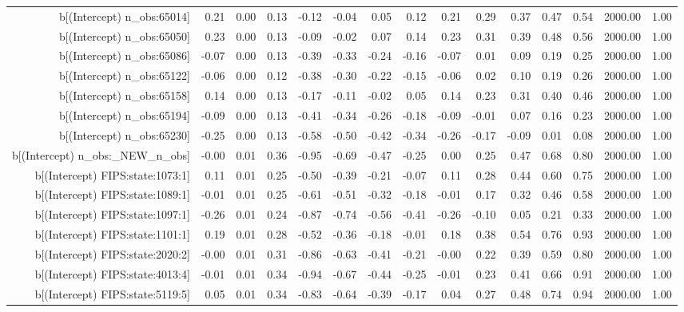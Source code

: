 \begin{table}[ht]
\begin{tabular}{rrrrrrrrrrrrrrr}
  b[(Intercept) n\_obs:65014] & 0.21 & 0.00 & 0.13 & -0.12 & -0.04 & 0.05 & 0.12 & 0.21 & 0.29 & 0.37 & 0.47 & 0.54 & 2000.00 & 1.00 \\ 
  b[(Intercept) n\_obs:65050] & 0.23 & 0.00 & 0.13 & -0.09 & -0.02 & 0.07 & 0.14 & 0.23 & 0.31 & 0.39 & 0.48 & 0.56 & 2000.00 & 1.00 \\ 
  b[(Intercept) n\_obs:65086] & -0.07 & 0.00 & 0.13 & -0.39 & -0.33 & -0.24 & -0.16 & -0.07 & 0.01 & 0.09 & 0.19 & 0.25 & 2000.00 & 1.00 \\ 
  b[(Intercept) n\_obs:65122] & -0.06 & 0.00 & 0.12 & -0.38 & -0.30 & -0.22 & -0.15 & -0.06 & 0.02 & 0.10 & 0.19 & 0.26 & 2000.00 & 1.00 \\ 
  b[(Intercept) n\_obs:65158] & 0.14 & 0.00 & 0.13 & -0.17 & -0.11 & -0.02 & 0.05 & 0.14 & 0.23 & 0.31 & 0.40 & 0.46 & 2000.00 & 1.00 \\ 
  b[(Intercept) n\_obs:65194] & -0.09 & 0.00 & 0.13 & -0.41 & -0.34 & -0.26 & -0.18 & -0.09 & -0.01 & 0.07 & 0.16 & 0.23 & 2000.00 & 1.00 \\ 
  b[(Intercept) n\_obs:65230] & -0.25 & 0.00 & 0.13 & -0.58 & -0.50 & -0.42 & -0.34 & -0.26 & -0.17 & -0.09 & 0.01 & 0.08 & 2000.00 & 1.00 \\ 
  b[(Intercept) n\_obs:\_NEW\_n\_obs] & -0.00 & 0.01 & 0.36 & -0.95 & -0.69 & -0.47 & -0.25 & 0.00 & 0.25 & 0.47 & 0.68 & 0.80 & 2000.00 & 1.00 \\ 
  b[(Intercept) FIPS:state:1073:1] & 0.11 & 0.01 & 0.25 & -0.50 & -0.39 & -0.21 & -0.07 & 0.11 & 0.28 & 0.44 & 0.60 & 0.75 & 2000.00 & 1.00 \\ 
  b[(Intercept) FIPS:state:1089:1] & -0.01 & 0.01 & 0.25 & -0.61 & -0.51 & -0.32 & -0.18 & -0.01 & 0.17 & 0.32 & 0.46 & 0.58 & 2000.00 & 1.00 \\ 
  b[(Intercept) FIPS:state:1097:1] & -0.26 & 0.01 & 0.24 & -0.87 & -0.74 & -0.56 & -0.41 & -0.26 & -0.10 & 0.05 & 0.21 & 0.33 & 2000.00 & 1.00 \\ 
  b[(Intercept) FIPS:state:1101:1] & 0.19 & 0.01 & 0.28 & -0.52 & -0.36 & -0.18 & -0.01 & 0.18 & 0.38 & 0.54 & 0.76 & 0.93 & 2000.00 & 1.00 \\ 
  b[(Intercept) FIPS:state:2020:2] & -0.00 & 0.01 & 0.31 & -0.86 & -0.63 & -0.41 & -0.21 & -0.00 & 0.22 & 0.39 & 0.59 & 0.80 & 2000.00 & 1.00 \\ 
  b[(Intercept) FIPS:state:4013:4] & -0.01 & 0.01 & 0.34 & -0.94 & -0.67 & -0.44 & -0.25 & -0.01 & 0.23 & 0.41 & 0.66 & 0.91 & 2000.00 & 1.00 \\ 
  b[(Intercept) FIPS:state:5119:5] & 0.05 & 0.01 & 0.34 & -0.83 & -0.64 & -0.39 & -0.17 & 0.04 & 0.27 & 0.48 & 0.74 & 0.94 & 2000.00 & 1.00 \\ 

\end{tabular}
\end{table}
